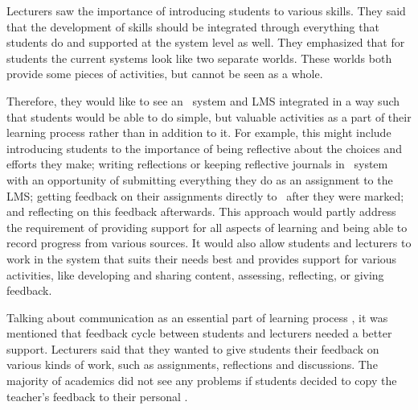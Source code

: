 
Lecturers saw the importance of introducing students to various \LLLs skills.
They said that the development of \LLLs skills should be integrated through
everything that students do and supported at the system level as well. They
emphasized that for students the current systems look like two separate worlds.
These worlds both provide some pieces of activities, but cannot be seen as a
whole.


Therefore, they would like to see an \ep~system and LMS integrated in a way
such that students would be able to do simple, but valuable activities as a part
of their learning process rather than in addition to it. For example, this might
include introducing students to the importance of being reflective about the
choices and efforts they make; writing reflections or keeping reflective
journals in \ep~system with an opportunity of submitting everything they do as
an assignment to the LMS; getting feedback on their assignments directly to
\ep~after they were marked; and reflecting on this feedback afterwards. This
approach would partly address the requirement of providing support for all
aspects of learning and being able to record progress from various sources. It
would also allow students and lecturers to work in the system that suits their
needs best and provides support for various activities, like developing and
sharing content, assessing, reflecting, or giving feedback.

Talking about communication as an essential part of learning process
\citep{Schaffert2008}, it was mentioned that feedback cycle between students
and lecturers needed a better support. Lecturers said that they wanted to give
students their feedback on various kinds of work, such as assignments,
reflections and discussions. The majority of academics did not see any problems
if students decided to copy the teacher's feedback to their personal \ep.


